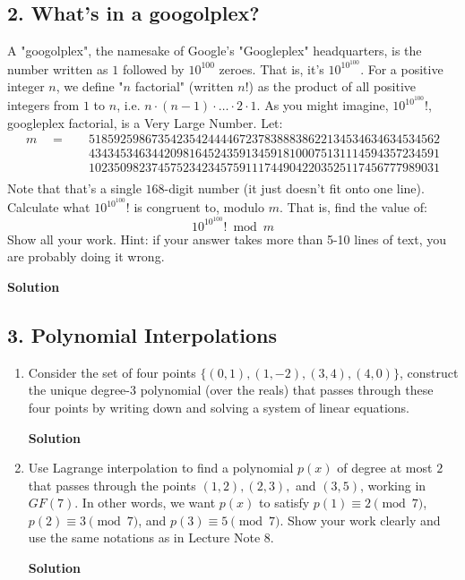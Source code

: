 \documentclass{article}\usepackage{amsmath,amssymb,amsthm,tikz,tkz-graph,color,chngpage,soul,hyperref,csquotes,graphicx,floatrow}\newcommand*{\QEDB}{\hfill\ensuremath{\square}}\newtheorem*{prop}{Proposition}\renewcommand{\theenumi}{\alph{enumi}}\usepackage[shortlabels]{enumitem}\usepackage[nobreak=true]{mdframed}\usetikzlibrary{matrix,calc}\MakeOuterQuote{"}\usepackage[margin=0.75in]{geometry} \newtheorem{theorem}{Theorem}
\begin{document}
\clearpage


\subsection*{2. What's in a googolplex?}
A "googolplex", the namesake of Google's "Googleplex" headquarters, is the number written as $1$ followed by $10^{100}$ zeroes. That is, it's $10^{{10}^{100}}$. For a positive integer $n$, we define "$n$ factorial" (written $n!$) as the product of all positive integers from $1$ to $n$, i.e. $n\cdot (n-1)\cdot\ldots\cdot 2\cdot 1$. As you might imagine, $10^{{10}^{100}}!$, googleplex factorial, is a Very Large Number. Let:
\begin{align*} m \quad= \quad & 51859259867354235424444672378388838622134534634634534562 \\ & 43434534634420981645243591345918100075131114594357234591 \\ & 10235098237457523423457591117449042203525117456777989031 \\ \end{align*}
Note that that's a single $168$-digit number (it just doesn't fit onto one line). Calculate what $10^{{10}^{100}}!$ is congruent to, modulo $m$. That is, find the value of:
$$10^{{10}^{100}}!\bmod m$$
Show all your work. Hint: if your answer takes more than 5-10 lines of text, you are probably doing it wrong.
\begin{mdframed}
\textbf{Solution}

\end{mdframed}
\clearpage


\subsection*{3. Polynomial Interpolations}
\begin{enumerate}
\item Consider the set of four points $\{(0,1),(1,-2),(3,4),(4,0)\}$, construct the unique degree-$3$ polynomial (over the reals) that passes through these four points by writing down and solving a system of linear equations.
\begin{mdframed}
\textbf{Solution}

\end{mdframed}
\item Use Lagrange interpolation to find a polynomial $p(x)$ of degree at most $2$ that passes through the points $(1,2),(2,3),$ and $(3,5)$, working in $GF(7)$. In other words, we want $p(x)$ to satisfy $p(1)\equiv 2\pmod 7$, $p(2)\equiv 3\pmod 7$, and $p(3)\equiv 5\pmod 7$. Show your work clearly and use the same notations as in Lecture Note 8.
\begin{mdframed}
\textbf{Solution}

\end{mdframed}
\end{enumerate}
\clearpage
\end{document}
